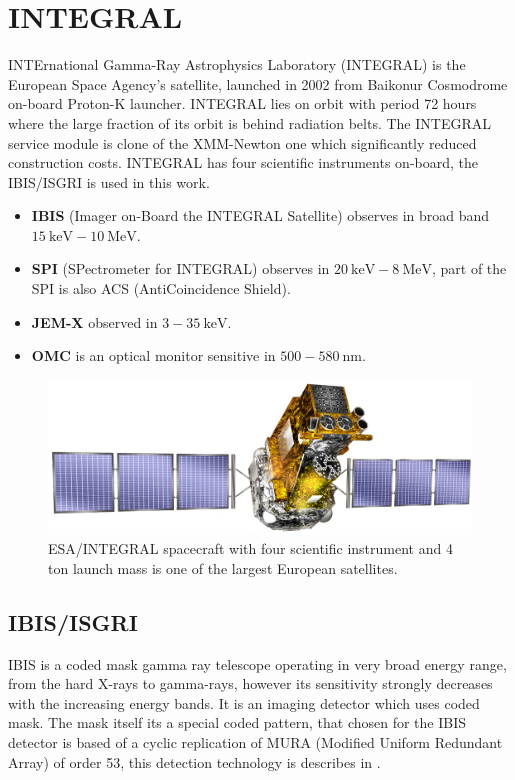 \documentclass[oneside,a4paper,11pt]{report}
\begin{document}
\section{INTEGRAL}
INTErnational Gamma-Ray Astrophysics Laboratory (INTEGRAL) is the European Space Agency's satellite, 
launched in 2002 from Baikonur Cosmodrome on-board Proton-K launcher. INTEGRAL lies on orbit with 
period 72 hours where the large fraction of its orbit is behind radiation belts. The INTEGRAL service 
module is clone of the XMM-Newton one which significantly reduced construction costs. 
INTEGRAL has four scientific instruments on-board, the IBIS/ISGRI is used in this work. 
\begin{itemize}
 \item \textbf{IBIS} (Imager on-Board the INTEGRAL Satellite) observes in broad band $15\:\mathrm{keV} -
10\:\mathrm{MeV}$.
\item \textbf{SPI} (SPectrometer for INTEGRAL) observes in $20\:\mathrm{keV}-8\:\mathrm{MeV}$, part of the SPI is
also ACS (AntiCoincidence Shield).
\item \textbf{JEM-X} observed in $3 - 35\:\mathrm{keV}$.
\item \textbf{OMC} is an optical monitor sensitive in $500-580\:\mathrm{nm}$.
\end{itemize}

\begin{figure}[!hbt]
\centering
\includegraphics[totalheight=4cm]{integral}
\caption{ESA/INTEGRAL spacecraft with four scientific instrument and 4 ton launch mass is one of the largest European satellites. }
\label{integral1} 
\end{figure}

\subsection{IBIS/ISGRI}
IBIS is a coded mask gamma ray telescope operating in very broad energy range, from the hard X-rays to 
gamma-rays, however its sensitivity strongly decreases with the increasing energy bands. It is an 
imaging detector which uses coded mask. The mask itself its a special coded pattern, that chosen for 
the IBIS detector is based of a cyclic replication of MURA (Modified Uniform Redundant Array) of order 
53, this detection technology is describes in \citet{mask1}.
\end{document}
